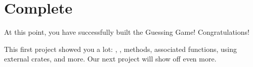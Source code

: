 \section{Complete}

At this point, you have successfully built the Guessing Game! Congratulations!

\blank

This first project showed you a lot: , , methods, associated functions, using external crates, and more. 
Our next project will show off even more.
